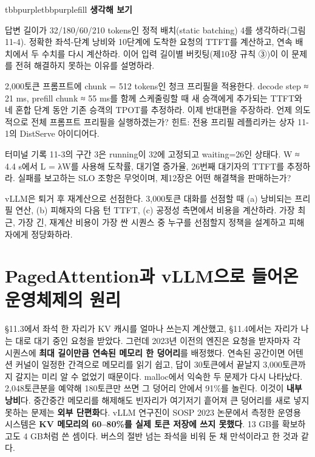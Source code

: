 \begin{calloutbox}{tbbpurple}{tbbpurplefill}
{\normalsize\bfseries\color{tbbpurple}생각해 보기}\par\vspace{3pt}
\begin{tbbitemize}
  \item 답변 길이가 32/180/60/210 tokens인 정적 배치(static batching) 4를 생각하라(그림 11-4). 정확한 좌석-단계 낭비와 10단계에 도착한 요청의 TTFT를 계산하고, 연속 배치에서 두 수치를 다시 계산하라. 이어 입력 길이별 버킷팅(제10장 규칙 ③)이 이 문제를 전혀 해결하지 못하는 이유를 설명하라.
  \item 2,000토큰 프롬프트에 chunk = 512 tokens인 청크 프리필을 적용한다. decode step ≈ 21 ms, prefill chunk ≈ 55 ms를 함께 스케줄링할 때 새 승객에게 추가되는 TTFT와 네 혼합 단계 동안 기존 승객의 TPOT를 추정하라. 이제 반대편을 주장하라. 언제 의도적으로 전체 프롬프트 프리필을 실행하겠는가? 힌트: 전용 프리필 레플리카는 상자 11-1의 DistServe 아이디어다.
  \item 터미널 기록 11-3의 구간 3은 running이 32에 고정되고 waiting=26인 상태다. W ≈ 4.4 s에서 L = λW를 사용해 도착률, 대기열 증가율, 26번째 대기자의 TTFT를 추정하라. 실패를 보고하는 SLO 조항은 무엇이며, 제12장은 어떤 해결책을 판매하는가?
  \item vLLM은 퇴거 후 재계산으로 선점한다. 3,000토큰 대화를 선점할 때 (a) 낭비되는 프리필 연산, (b) 피해자의 다음 턴 TTFT, (c) 공정성 측면에서 비용을 계산하라. 가장 최근, 가장 긴, 재계산 비용이 가장 싼 시퀀스 중 누구를 선점할지 정책을 설계하고 피해자에게 정당화하라.
\end{tbbitemize}
\end{calloutbox}

\section{PagedAttention과 vLLM으로 들어온 운영체제의 원리}

§11.3에서 좌석 한 자리가 KV 캐시를 얼마나 쓰는지 계산했고, §11.4에서는 자리가 나는 대로 대기 중인 요청을 받았다. 그런데 2023년 이전의 엔진은 요청을 받자마자 각 시퀀스에 \textbf{최대 길이만큼 연속된 메모리 한 덩어리}를 배정했다. 연속된 공간이면 어텐션 커널이 일정한 간격으로 메모리를 읽기 쉽고, 답이 30토큰에서 끝날지 3,000토큰까지 갈지는 미리 알 수 없었기 때문이다. malloc에서 익숙한 두 문제가 다시 나타났다. 2,048토큰분을 예약해 180토큰만 쓰면 그 덩어리 안에서 91\%를 놀린다. 이것이 \textbf{내부 낭비}다. 중간중간 메모리를 해제해도 빈자리가 여기저기 흩어져 큰 덩어리를 새로 넣지 못하는 문제는 \textbf{외부 단편화}다. vLLM 연구진이 SOSP 2023 논문에서 측정한 운영용 시스템은 \textbf{KV 메모리의 60–80\%를 실제 토큰 저장에 쓰지 못했다}. 13 GB를 확보하고도 4 GB처럼 쓴 셈이다. 버스의 절반 넘는 좌석을 비워 둔 채 만석이라고 한 것과 같다.


